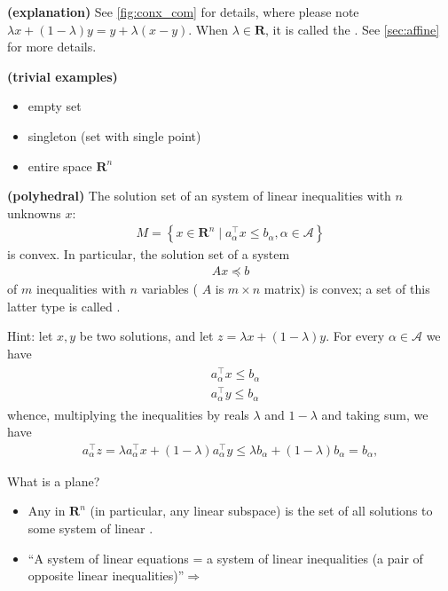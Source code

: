 \documentclass{article}
\newcommand{\bfs}[1]{\textbf{({#1}) }}
\begin{document}
\begin{exma}{\bfs{explanation}}
See \cref{fig:conx_com} for details, where please note $\lambda x +(1-\lambda)y = y+\lambda(x-y)$. When $\lambda\in \mathbf{R}$, it is called the . See \cref{sec:affine} for more details.
\end{exma}
\begin{rema}{\bfs{trivial examples}}
\begin{itemize}
    \item  empty set
    \item singleton (set with single point)
    \item entire space  $\mathbf{R}^{n}$
\end{itemize}
\end{rema}

\begin{exma}{\bfs{polyhedral}}\label{exm:polyh}
The solution set of an  system
of linear inequalities with $n$ unknowns $x$:
\begin{align}
M=\left\{x \in \mathbf{R}^{n} \mid a_{\alpha}^{\top} x \leq b_{\alpha}, \alpha \in \mathcal{A}\right\}\label{eq:gen_ineq}
\end{align}
is convex. In particular, the solution set of a  system
\begin{align*}
A x \preceq b
\end{align*}
of $m$ inequalities with $n$ variables ( $A$ is $m \times n$ matrix) is convex; a set of this latter type is called .

Hint: let $x, y$ be two solutions, and let $z=\lambda x+(1-\lambda) y$. For every $\alpha \in \mathcal{A}$ we have
\begin{align*}
\begin{aligned}
&a_{\alpha}^{\top} x \leq b_{\alpha} \\
&a_{\alpha}^{\top} y \leq b_{\alpha}
\end{aligned}
\end{align*}
whence, multiplying the inequalities by  reals $\lambda$ and $1-\lambda$ and taking sum, we have
\begin{align*}
a_{\alpha}^{\top} z=\lambda a_{\alpha}^{\top} x+(1-\lambda) a_{\alpha}^{\top} y \leq \lambda b_{\alpha}+(1-\lambda) b_{\alpha}=b_{\alpha},
\end{align*}
\end{exma}
\begin{exma}\label{exma:plane}What is a plane?
\begin{itemize}
    \item Any  in $\mathbf{R}^{n}$ (in particular, any linear subspace) is the set of all solutions to some system of linear .
    \item ``A system of linear equations = a system of linear inequalities (a pair of opposite linear inequalities)''$\Rightarrow$  
\end{itemize}
\end{exma}
\end{document}

